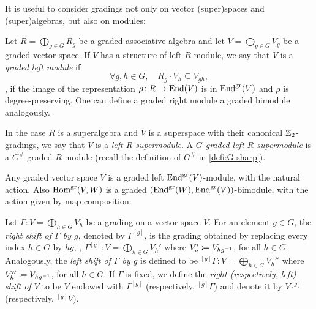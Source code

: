It is useful to consider gradings not only on vector (super)spaces and (super)algebras, but also on modules:

\begin{defi}\label{defi:grdModule}
    Let $R = \bigoplus_{g\in G} R_g$ be a graded associative algebra and let $V = \bigoplus_{g\in G} V_g$ be a graded vector space. 
    If $V$ has a structure of left $R$-module, we say that $V$ is a \emph{graded left module} if 
    \[
        \forall g,h \in G, \quad R_g \cdot V_h \subseteq V_{gh},
    \]
    \ie, if the image of the representation $\rho\colon R \to \operatorname{End}(V)$ is in $\operatorname{End}^{\textrm{gr}}(V)$ and $\rho$ is degree-preserving. 
    One can define a graded right module a graded bimodule analogously. 
\end{defi}

In the case $R$ is a superalgebra and $V$ is a superspace with their canonical $\mathbb{Z}_2$-gradings, we say that $V$ is a \emph{left $R$-supermodule}. 
A \emph{$G$-graded left $R$-supermodule} is a $G^\#$-graded $R$-module (recall the definition of $G^\#$ in \cref{defi:G-sharp}).

\begin{ex}
    Any graded vector space $V$ is a graded left $\operatorname{End}^{\textrm{gr}}(V)$-module, with the natural action. 
    Also $\operatorname{Hom}^{\textrm{gr}}(V, W)$ is a graded $(\operatorname{End}^{\textrm{gr}}(W),\operatorname{End}^{\textrm{gr}}(V))$-bimodule, with the action given by map composition. 
\end{ex}




\begin{defi}
    Let $\Gamma: V = \bigoplus_{h\in G} V_h$ be a grading on a vector space $V$. 
    For an element $g\in G$, the \emph{right shift of $\Gamma$ by $g$}, denoted by $\Gamma^{[g]}$, is the grading obtained by replacing every index $h \in G$ by $hg$, \ie, $\Gamma^{[g]} : V = \bigoplus_{h\in G} V_h'$ where $V_{g}' \coloneqq V_{hg^{-1}}$, for all $h\in G$. 
    Analogously, the \emph{left shift of $\Gamma$ by $g$} is defined to be ${}^{[g]}\Gamma : V = \bigoplus_{h\in G} V_h''$ where $V_{h}'' \coloneqq V_{hg^{-1}}$, for all $h\in G$. 
    If $\Gamma$ is fixed, we define the \emph{right (respectively, left) shift of $V$} to be $V$ endowed with $\Gamma^{[g]}$ (respectively, ${}^{[g]}\Gamma$) and denote it by $V^{[g]}$ (respectively, ${}^{[g]}V$).
\end{defi}

